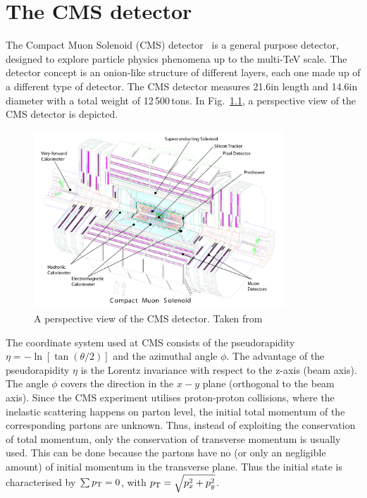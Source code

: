 \chapter{The CMS detector}
The Compact Muon Solenoid (CMS) detector~\cite{bib:CMS:experiment,bib:CMS:TDR} is a general purpose detector, designed to explore particle physics phenomena up to the multi-TeV scale.
The detector concept is an onion-like structure of different layers, each one made up of a different type of detector. 
The CMS detector measures 21.6\m in length and 14.6\m in diameter with a total weight of 12\,500\,tons.
In Fig.~\ref{fig:CMSdetector}, a perspective view of the CMS detector is depicted. 
\begin{figure}[!b]
  \centering
      \includegraphics[width=0.84\textwidth]{figures/experiment/CMS/cms_complete_labelled_reduced_size.pdf}
  \caption{A perspective view of the CMS detector. Taken from~\cite{bib:CMS:experiment}}  
  \label{fig:CMSdetector}
\end{figure}

The coordinate system used at CMS consists of the pseudorapidity $\eta = -\ln \left[ \tan{\left(\theta/2\right)} \right]$ and the azimuthal angle $\phi$.
The advantage of the pseudorapidity $\eta$ is the Lorentz invariance with respect to the z-axis (beam axis).
The angle $\phi$ covers the direction in the $x-y$ plane (orthogonal to the beam axis).
Since the CMS experiment utilises proton-proton collisions, where the inelastic scattering happens on parton level, the initial total momentum of the corresponding partons are unknown.
Thus, instead of exploiting the conservation of total momentum, only the conservation of transverse momentum is usually used.
This can be done because the partons have no (or only an negligible amount) of initial momentum in the transverse plane.
Thus the initial state is characterised by $\sum{\ensuremath{p_{\text{T}}}}=0$, with $p_{\text{T}} = \sqrt{p_x^2 + p_y^2}$.

